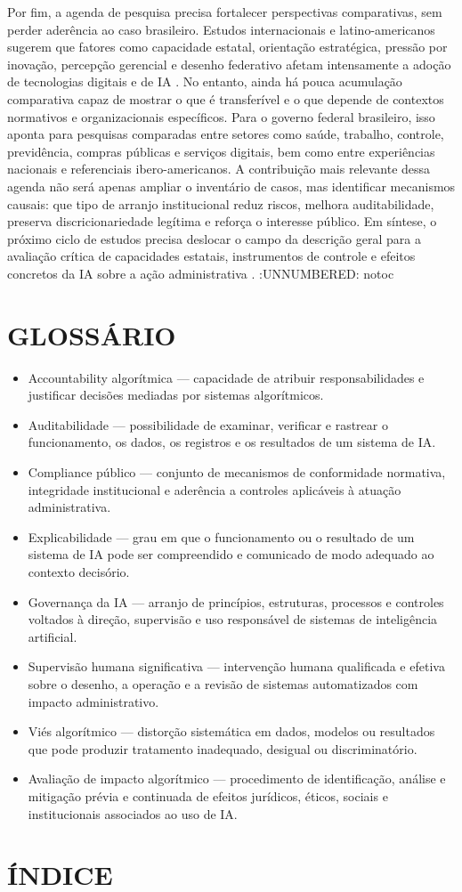\documentclass[12pt,a4paper]{article}
\begin{document}
Por fim, a agenda de pesquisa precisa fortalecer perspectivas comparativas, sem perder aderência ao caso brasileiro. Estudos internacionais e latino-americanos sugerem que fatores como capacidade estatal, orientação estratégica, pressão por inovação, percepção gerencial e desenho federativo afetam intensamente a adoção de tecnologias digitais e de IA \autocite{yiitcanlar2022artificial} \autocite{david2023understanding} \autocite{criado2024inteligencia}. No entanto, ainda há pouca acumulação comparativa capaz de mostrar o que é transferível e o que depende de contextos normativos e organizacionais específicos. Para o governo federal brasileiro, isso aponta para pesquisas comparadas entre setores como saúde, trabalho, controle, previdência, compras públicas e serviços digitais, bem como entre experiências nacionais e referenciais ibero-americanos. A contribuição mais relevante dessa agenda não será apenas ampliar o inventário de casos, mas identificar mecanismos causais: que tipo de arranjo institucional reduz riscos, melhora auditabilidade, preserva discricionariedade legítima e reforça o interesse público. Em síntese, o próximo ciclo de estudos precisa deslocar o campo da descrição geral para a avaliação crítica de capacidades estatais, instrumentos de controle e efeitos concretos da IA sobre a ação administrativa \autocite{madan2022ai} \autocite{serra2024a} \autocite{criado2024artificial}.
:UNNUMBERED: notoc
\section*{GLOSSÁRIO}
\label{sec:orgea7f853}
\begin{itemize}
\item Accountability algorítmica — capacidade de atribuir responsabilidades e justificar decisões mediadas por sistemas algorítmicos.
\item Auditabilidade — possibilidade de examinar, verificar e rastrear o funcionamento, os dados, os registros e os resultados de um sistema de IA.
\item Compliance público — conjunto de mecanismos de conformidade normativa, integridade institucional e aderência a controles aplicáveis à atuação administrativa.
\item Explicabilidade — grau em que o funcionamento ou o resultado de um sistema de IA pode ser compreendido e comunicado de modo adequado ao contexto decisório.
\item Governança da IA — arranjo de princípios, estruturas, processos e controles voltados à direção, supervisão e uso responsável de sistemas de inteligência artificial.
\item Supervisão humana significativa — intervenção humana qualificada e efetiva sobre o desenho, a operação e a revisão de sistemas automatizados com impacto administrativo.
\item Viés algorítmico — distorção sistemática em dados, modelos ou resultados que pode produzir tratamento inadequado, desigual ou discriminatório.
\item Avaliação de impacto algorítmico — procedimento de identificação, análise e mitigação prévia e continuada de efeitos jurídicos, éticos, sociais e institucionais associados ao uso de IA.
\end{itemize}
\section*{ÍNDICE}
\label{sec:org575e249}
\printbibliography
\end{document}
